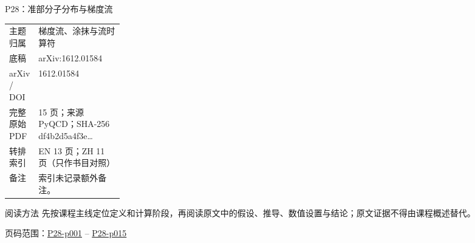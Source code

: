 \documentclass[aspectratio=169,10pt]{ctexbeamer}
\begin{document}
\begin{frame}[t]{P28：准部分子分布与梯度流}
\small\begin{tabularx}{\linewidth}{p{0.22\linewidth}Y}
\toprule 主题归属 & 梯度流、涂抹与流时算符\\
底稿 & arXiv:1612.01584\\
arXiv / DOI & 1612.01584\\
完整原始 PDF & 15 页；来源 PyQCD；SHA-256 df4b2d5a4f3e\ldots\\
转排索引 & EN 13 页；ZH 11 页（只作书目对照）\\
备注 & 索引未记录额外备注。\\
\bottomrule\end{tabularx}\vspace{0.25cm}
\begin{block}{阅读方法}
先按课程主线定位定义和计算阶段，再阅读原文中的假设、推导、数值设置与结论；原文证据不得由课程概述替代。
\end{block}
\vfill 页码范围：\hyperlink{P28-p001}{P28-p001} -- \hyperlink{P28-p015}{P28-p015}
\end{frame}
\end{document}
